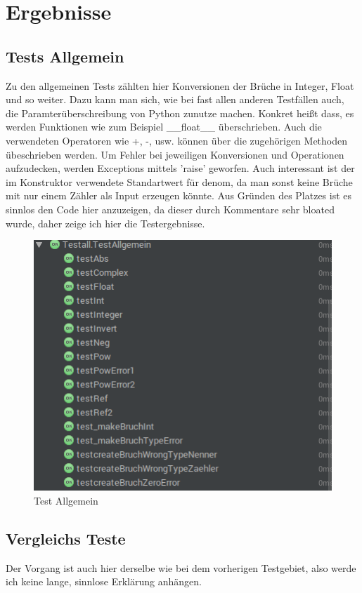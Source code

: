 
\section{Ergebnisse}
\label{sec:Ergebnisse}
	
\subsection{Tests Allgemein}
Zu den allgemeinen Tests zählten hier Konversionen der Brüche in Integer, Float und so weiter.
Dazu kann man sich, wie bei fast allen anderen Testfällen auch, die Paramterüberschreibung von
Python zunutze machen. Konkret hei{\ss}t dass, es werden Funktionen wie zum Beispiel \_\_float\_\_
überschrieben. Auch die verwendeten Operatoren wie +, -, usw. können über die zugehörigen Methoden 
übeschrieben werden. Um Fehler bei jeweiligen Konversionen und Operationen aufzudecken, werden
Exceptions mittels 'raise' geworfen. 
Auch interessant ist der im Konstruktor verwendete Standartwert für denom, da man sonst keine Brüche
mit nur einem Zähler als Input erzeugen könnte.
Aus Gründen des Platzes ist es sinnlos den Code hier anzuzeigen, da dieser durch Kommentare sehr bloated wurde, daher zeige ich hier die Testergebnisse.

\begin{figure}[!h]
	\begin{center}
		\includegraphics[width=0.6\linewidth]{images/testAllgemein.png}
		\caption{Test Allgemein}
		\label{broker}
	\end{center}
\end{figure}
\clearpage

\subsection{Vergleichs Teste}
Der Vorgang ist auch hier derselbe wie bei dem vorherigen Testgebiet, also werde ich keine lange, sinnlose Erklärung anhängen.


